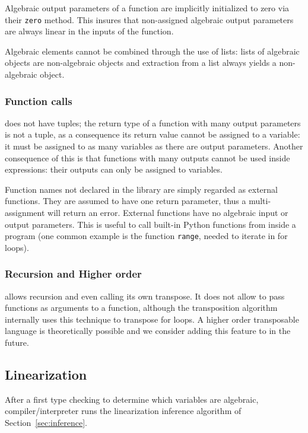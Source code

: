 Algebraic output parameters of a function are implicitly initialized
to zero via their \lstinline+zero+ method. This insures that
non-assigned algebraic output parameters are always linear in the
inputs of the function.

Algebraic elements cannot be combined through the use of lists: lists
of algebraic objects are non-algebraic objects and extraction from a
list always yields a non-algebraic object.


\subsubsection{Function calls}
\tALpy{} does not have tuples; the return type of a function with many
output parameters is not a tuple, as a consequence its return value
cannot be assigned to a variable: it must be assigned to as many
variables as there are output parameters.  Another consequence of this
is that functions with many outputs cannot be used inside expressions:
their outputs can only be assigned to variables.

Function names not declared in the library are simply regarded as
external functions. They are assumed to have one return parameter,
thus a multi-assignment will return an error. External functions have
no algebraic input or output parameters. This is useful to call
built-in Python functions from inside a \tALpy{} program (one common
example is the function \lstinline+range+, needed to iterate in for
loops).

\subsubsection{Recursion and Higher order}
\tALpy{} allows recursion and even calling its own transpose. It does
not allow to pass functions as arguments to a function, although the
transposition algorithm internally uses this technique to transpose
for loops. A higher order transposable language is theoretically
possible and we consider adding this feature to \tALpy{} in the
future.

\subsection{Linearization}
\label{sec:linearization}

After a first type checking to determine which variables are
algebraic, \tALpy{} compiler/interpreter runs the linearization
inference algorithm of Section~\ref{sec:inference}. 

